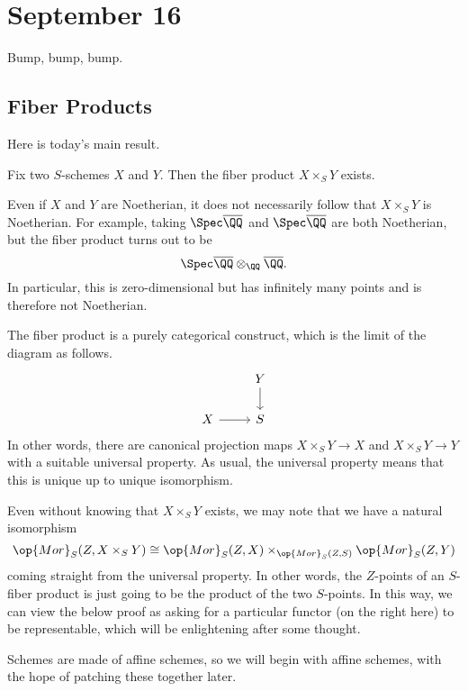 \documentclass[../notes.tex]{subfiles}
\begin{document}
\section{September 16}

Bump, bump, bump.

\subsection{Fiber Products}
Here is today's main result.
\begin{theorem} \label{thm:fibexist}
	Fix two $S$-schemes $X$ and $Y$. Then the fiber product $X\times_SY$ exists.
\end{theorem}
\begin{remark}
	Even if $X$ and $Y$ are Noetherian, it does not necessarily follow that $X\times_SY$ is Noetherian. For example, taking $\Spec\overline\QQ$ and $\Spec\overline\QQ$ are both Noetherian, but the fiber product turns out to be
	\[\Spec\overline\QQ\otimes_\QQ\overline\QQ.\]
	In particular, this is zero-dimensional but has infinitely many points and is therefore not Noetherian.
\end{remark}
The fiber product is a purely categorical construct, which is the limit of the diagram as follows.
\[\begin{tikzcd}
	& Y \\
	X & S
	\arrow[from=2-1, to=2-2]
	\arrow[from=1-2, to=2-2]
\end{tikzcd}\]
In other words, there are canonical projection maps $X\times_SY\to X$ and $X\times_SY\to Y$ with a suitable universal property. As usual, the universal property means that this is unique up to unique isomorphism.
\begin{remark}
	Even without knowing that $X\times_SY$ exists, we may note that we have a natural isomorphism
	\[\op{Mor}_S(Z,X\times_SY)\cong\op{Mor}_S(Z,X)\times_{\op{Mor}_S(Z,S)}\op{Mor}_S(Z,Y)\]
	coming straight from the universal property. In other words, the $Z$-points of an $S$-fiber product is just going to be the product of the two $S$-points. In this way, we can view the below proof as asking for a particular functor (on the right here) to be representable, which will be enlightening after some thought.
\end{remark}
Schemes are made of affine schemes, so we will begin with affine schemes, with the hope of patching these together later.
\end{document}
